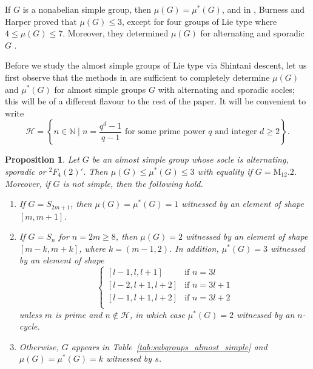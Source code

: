 \documentclass[11pt]{article}
\numberwithin{equation}{section}
\theoremstyle{shdefinition}
\theoremstyle{shplain}
\newtheorem{proposition}[definition]{Proposition}
\newcommand{\<}{\langle}
\renewcommand{\>}{\rangle}
\renewcommand{\leq}{\leqslant}
\renewcommand{\geq}{\geqslant}
\renewcommand{\:}{\colon}
\begin{document}
If $G$ is a nonabelian simple group, then $\mu(G) = \mu^*(G)$, and in \cite[Theorem~5]{ref:BurnessHarper19}, Burness and Harper proved that $\mu(G) \leq 3$, except for four groups of Lie type where $4 \leq \mu(G) \leq 7$. Moreover, they determined $\mu(G)$ for alternating and sporadic $G$ \cite[Theorems~3.1 and~4.1]{ref:BurnessHarper19}.

Before we study the almost simple groups of Lie type via Shintani descent, let us first observe that the methods in \cite{ref:BurnessHarper19} are sufficient to completely determine $\mu(G)$ and $\mu^*(G)$ for almost simple groups $G$ with alternating and sporadic socles; this will be of a different flavour to the rest of the paper. It will be convenient to write
\[
\mathcal{H} = \left\{ n \in \mathbb{N} \mid \text{$n = \frac{q^d-1}{q-1}$ for some prime power $q$ and integer $d \geq 2$} \right\}.
\]

\begin{proposition} \label{prop:subgroups_almost_simple}
Let $G$ be an almost simple group whose socle is alternating, sporadic or ${}^2F_4(2)'$. Then $\mu(G) \leq \mu^*(G) \leq 3$ with equality if $G = \mathrm{M}_{12}.2$. Moreover, if $G$ is not simple, then the following hold.
\begin{enumerate}
\item If $G = S_{2m+1}$, then $\mu(G) = \mu^*(G) = 1$ witnessed by an element of shape $[m,m+1]$.
\item If $G = S_n$ for $n = 2m \geq 8$, then $\mu(G) = 2$ witnessed by an element of shape $[m-k,m+k]$, where $k=(m-1,2)$. In addition, $\mu^*(G) = 3$ witnessed by an element of shape 
\[
\left\{ 
\begin{array}{ll}
{[l-1,l,l+1]}   & \text{if $n=3l$}   \\
{[l-2,l+1,l+2]} & \text{if $n=3l+1$} \\
{[l-1,l+1,l+2]} & \text{if $n=3l+2$} \\
\end{array}
\right.
\]
unless $m$ is prime and $n \not\in \mathcal{H}$, in which case $\mu^*(G) = 2$ witnessed by an $n$-cycle.
\item Otherwise, $G$ appears in Table~\ref{tab:subgroups_almost_simple} and $\mu(G) = \mu^*(G) = k$ witnessed by $s$.
\end{enumerate}
\end{proposition}
\end{document}
